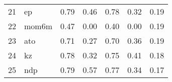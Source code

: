 \documentclass[12pt]{article}
\begin{document}
\begin{footnotesize}
\begin{longtable}{rl|c|c|c|c|c}
				21                   & ep                          & 0.79                             & 0.46                                                                                          & 0.78                                                                                          & 0.32                                                                                          & 0.19                                                                                                   \\
				22                   & mom6m                       & 0.47                             & 0.00                                                                                          & 0.40                                                                                          & 0.00                                                                                          & 0.19                                                                                                   \\
				23                   & ato                         & 0.71                             & 0.27                                                                                          & 0.70                                                                                          & 0.36                                                                                          & 0.19                                                                                                   \\
				24                   & kz                          & 0.78                             & 0.32                                                                                          & 0.75                                                                                          & 0.41                                                                                          & 0.18                                                                                                   \\
				25                   & ndp                         & 0.79                             & 0.57                                                                                          & 0.77                                                                                          & 0.34                                                                                          & 0.17                                                                                                   \\

\end{longtable}
\end{footnotesize}
\end{document}
